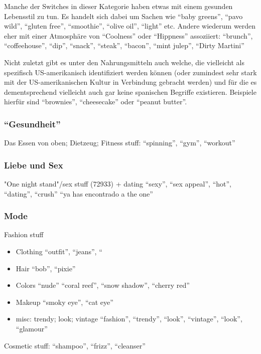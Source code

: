 Manche der Switches in dieser Kategorie haben etwas mit einem gesunden Lebensstil zu tun.
Es handelt sich dabei um Sachen wie ``baby greens'', ``pavo wild'', ``gluten free'', ``smoothie'', ``olive oil'', ``light'' etc.
Andere wiederum werden eher mit einer Atmosphäre von ``Coolness'' oder ``Hippness'' assoziiert:
``brunch'', ``coffeehouse'', ``dip'', ``snack'', ``steak'', ``bacon'', ``mint julep'', ``Dirty Martini''

Nicht zuletzt gibt es unter den Nahrungsmitteln auch welche, die vielleicht als spezifisch US-amerikanisch identifiziert werden können (oder zumindest sehr stark mit der US-amerikanischen Kultur in Verbindung gebracht werden) und für die es dementsprechend vielleicht auch gar keine spanischen Begriffe existieren.
Beispiele hierfür sind ``brownies'', ``cheesecake'' oder ``peanut butter''.

\subsubsection{``Gesundheit''}
Das Essen von oben;
Dietzeug;
Fitness stuff: ``spinning'', ``gym'', ``workout''


\subsubsection{Liebe und Sex}
 "One night stand"/sex stuff (72933) + dating
      ``sexy'', ``sex appeal'', ``hot'', ``dating'', ``crush''
        ``ya has encontrado a the one''

\subsubsection{Mode}
  \item Fashion stuff
    \begin{itemize}
      \item Clothing
          ``outfit'', ``jeans'', ``
      \item Hair
          ``bob'', ``pixie''
      \item Colors
          ``nude'' ``coral reef'', ``snow shadow'', ``cherry red''
      \item Makeup
          ``smoky eye'', ``cat eye''
      \item misc: trendy; look; vintage
          ``fashion'', ``trendy'', ``look'', ``vintage'', ``look'', ``glamour''
    \end{itemize}
  \item Cosmetic stuff:
      ``shampoo'', ``frizz'', ``cleanser''

